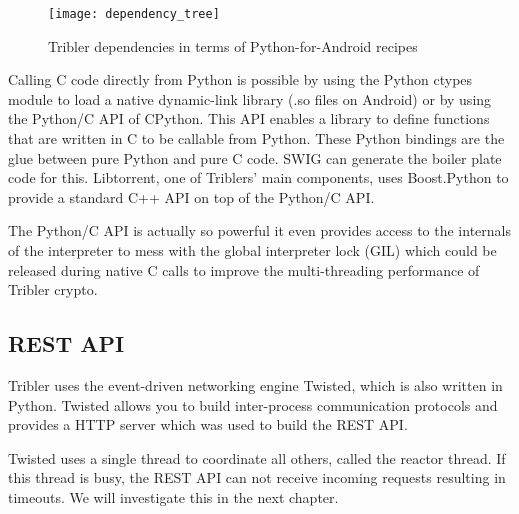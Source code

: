 \begin{figure}[H]
	\centering
	\texttt{[image: dependency\_tree]}
	\caption{Tribler dependencies in terms of Python-for-Android recipes}
	\label{fig:dependency_tree}
\end{figure}

Calling C code directly from Python is possible by using the Python ctypes module to load a native dynamic-link library (.so files on Android) or by using the Python/C API of CPython.
This API enables a library to define functions that are written in C to be callable from Python.
These Python bindings are the glue between pure Python and pure C code.
SWIG can generate the boiler plate code for this.
Libtorrent, one of Triblers' main components, uses Boost.Python to provide a standard C++ API on top of the Python/C API.

The Python/C API is actually so powerful it even provides access to the internals of the interpreter to mess with the global interpreter lock (GIL) which could be released during native C calls to improve the multi-threading performance of Tribler crypto.


\subsection{REST API}
Tribler uses the event-driven networking engine Twisted, which is also written in Python.
Twisted allows you to build inter-process communication protocols and provides a HTTP server which was used to build the REST API.

Twisted uses a single thread to coordinate all others, called the reactor thread.
If this thread is busy, the REST API can not receive incoming requests resulting in timeouts.
We will investigate this in the next chapter.


